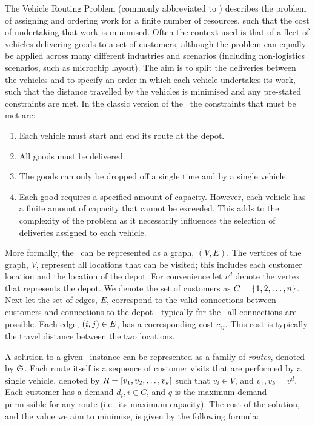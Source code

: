 The Vehicle Routing Problem (commonly abbreviated to \VRP) describes the problem of assigning and ordering work for a finite number of resources, such that the cost of undertaking that work is minimised. Often the context used is that of a fleet of vehicles delivering goods to a set of customers, although the problem can equally be applied across many different industries and scenarios (including non-logistics scenarios, such as microchip layout). The aim is to split the deliveries between the vehicles and to specify an order in which each vehicle undertakes its work, such that the distance travelled by the vehicles is minimised and any pre-stated constraints are met. In the classic version of the \VRP\ the constraints that must be met are: 

\begin{enumerate}
   \item Each vehicle must start and end its route at the depot.
   \item All goods must be delivered.
   \item The goods can only be dropped off a single time and by a single vehicle.
   \item Each good requires a specified amount of capacity. However, each vehicle has a finite amount of capacity that cannot be exceeded. This adds to the complexity of the problem as it necessarily influences the selection of deliveries assigned to each vehicle.
\end{enumerate}


More formally, the \VRP\ can be represented as a graph, $(V,E)$. The vertices of the graph, $V$, represent all locations that can be visited; this includes each customer location and the location of the depot. For convenience let $v^d$ denote the vertex that represents the depot. We denote the set of customers as $C = \{1,2,\ldots,n\}$. Next let the set of edges, $E$, correspond to the valid connections between customers and connections to the depot---typically for the \VRP\ all connections are possible. Each edge, $(i,j) \in E$, has a corresponding cost $c_{ij}$. This cost is typically the travel distance between the two locations.

A solution to a given \VRP\ instance can be represented as a family of \emph{routes}, denoted by $\mathfrak{S}$. Each route itself is a sequence of customer visits that are performed by a single vehicle, denoted by $R = [v_1, v_2,\ldots, v_k]$ such that $v_i \in V$, and $v_1, v_k = v^d$. Each customer has a demand $d_i, i \in C$, and $q$ is the maximum demand permissible for any route (i.e.~its maximum capacity). The cost of the solution, and the value we aim to minimise, is given by the following formula:

